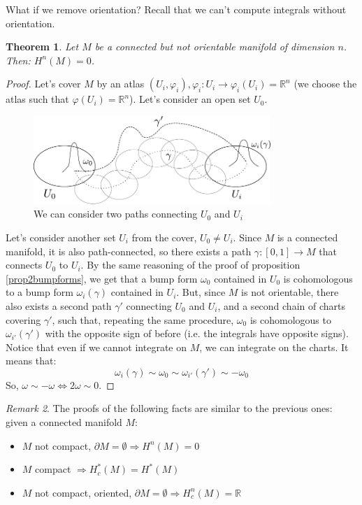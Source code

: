 \documentclass[a4paper,11pt,titlepage, article, oneside]{memoir}
\numberwithin{equation}{section}
\newtheorem{theorem}{Theorem}[section]
\theoremstyle{definition}
\theoremstyle{remark}
\newtheorem{remark}[theorem]{Remark}
\newcommand{\rfield}{\mathbb{R}}
\begin{document}
What if we remove orientation? Recall that we can't compute integrals without orientation.
\begin{theorem}
Let $M$ be a connected but not orientable manifold of dimension $n$. Then: $H^n(M) = 0$.
\end{theorem}
\begin{proof}
Let's cover $M$ by an atlas $(U_i, \varphi_i), \varphi_i \colon U_i \rightarrow \varphi_i(U_i) = \rfield^n$ (we choose the atlas such that $\varphi(U_i) = \rfield^n$). Let's consider an open set $U_0$.
\begin{figure}[H] \label{Fig:bumpforms3}
     \centering
     \includegraphics[width=0.8\textwidth]{Images/bumpforms3.pdf} 
     \caption{We can consider two paths connecting $U_0$ and $U_i$}      
\end{figure}
Let's consider another set $U_i$ from the cover, $U_0 \not = U_i$. Since $M$ is a connected manifold, it is also path-connected, so there exists a path $\gamma \colon [0, 1] \rightarrow M$ that connects $U_0$ to $U_i$. By the same reasoning of the proof of proposition \ref{prop2bumpforms}, we get that a bump form $\omega_0$ contained  in $U_0$ is cohomologous to a bump form $\omega_i(\gamma)$ contained in $U_i$. But, since $M$ is not orientable, there also exists a second path $\gamma'$ connecting $U_0$ and $U_i$, and a second chain of charts covering $\gamma'$, such that, repeating the same procedure, $\omega_0$ is cohomologous to $\omega_{i'}(\gamma')$ with the opposite sign of before (i.e. the integrals have opposite signs). Notice that even if we cannot integrate on $M$, we can integrate on the charts. It means that:
$$\omega_i(\gamma) \sim \omega_0 \sim \omega_{i'}(\gamma') \sim -\omega_0$$
So, $\omega \sim - \omega \Leftrightarrow 2 \omega \sim 0$.
\end{proof}

\begin{remarkbox}\begin{remark}
The proofs of the following facts are similar to the previous ones: given a connected manifold $M$:
\begin{itemize}
\item $M$ not compact, $\partial M = \emptyset \Rightarrow H^n(M)=0$
\item $M$ compact $\Rightarrow H_c^*(M) = H^*(M)$
\item $M$ not compact, oriented, $\partial M= \emptyset \Rightarrow H^n_c(M)=\rfield$ 
\end{itemize}
\end{remark}\end{remarkbox}
\end{document}
